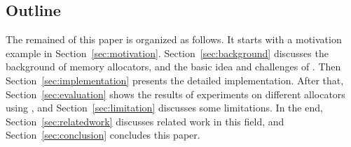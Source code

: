 \subsection*{Outline}

The remained of this paper is organized as follows. It starts with a motivation example in Section~\ref{sec:motivation}. Section~\ref{sec:background} discusses the background of memory allocators, and the basic idea and challenges of \MP{}. Then Section~\ref{sec:implementation} presents the detailed implementation. After that, Section~\ref{sec:evaluation} shows the results of experiments on different allocators using \MP{}, and Section~\ref{sec:limitation} discusses some limitations. In the end, Section~\ref{sec:relatedwork} discusses related work in this field, and Section~\ref{sec:conclusion} concludes this paper.